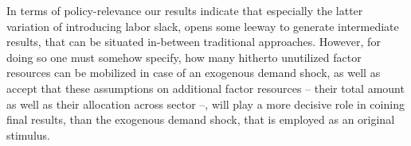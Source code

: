 In terms of policy-relevance our results indicate that especially the latter variation of introducing labor slack, opens some leeway to generate intermediate results, that can be situated in-between traditional approaches. However, for doing so one must somehow specify, how many hitherto unutilized factor resources can be mobilized in case of an exogenous demand shock, as well as accept that these assumptions on additional factor resources -- their total amount as well as their allocation across sector --, will play a more decisive role in coining final results, than the exogenous demand shock, that is employed as an original stimulus.

